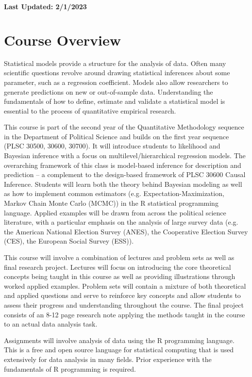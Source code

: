 \documentclass[11pt, article, oneside]{memoir}
\title{{\mytitle}}
\author{\myauthor\smallskip\footnotesize\newline Office: Pick Hall 328, 3rd floor
  \newline Office Hours: Tuesdays 4pm-6pm or schedule an appointment by e-mail \newline
    \myemail \newline \mywebsite
\newline
}
\date{}
\theoremstyle{Assumption}
\begin{document}
\maketitle
\textbf{Last Updated: 2/1/2023}
\section*{Course Overview}

Statistical models provide a structure for the analysis of data. Often many scientific questions revolve around drawing statistical inferences about some parameter, such as a regression coefficient. Models also allow researchers to generate predictions on new or out-of-sample data. Understanding the fundamentals of how to define, estimate and validate a statistical model is essential to the process of quantitative empirical research.

This course is part of the second year of the Quantitative Methodology sequence in the Department of Political Science and builds on the first year sequence (PLSC 30500, 30600, 30700). It will introduce students to likelihood and Bayesian inference with a focus on multilevel/hierarchical regression models. The overarching framework of this class is model-based inference for description and prediction -- a complement to the design-based framework of PLSC 30600 Causal Inference. Students will learn both the theory behind Bayesian modeling as well as how to implement common estimators (e.g. Expectation-Maximization, Markov Chain Monte Carlo (MCMC)) in the R statistical programming language. Applied examples will be drawn from across the political science literature, with a particular emphasis on the analysis of large survey data (e.g. the American National Election Survey (ANES), the Cooperative Election Survey (CES), the European Social Survey (ESS)).

This course will involve a combination of lectures and problem sets as well as final research project. Lectures will focus on introducing the core theoretical concepts being taught in this course as well as providing illustrations through worked applied examples. Problem sets will contain a mixture of both theoretical and applied questions and serve to reinforce key concepts and allow students to assess their progress and understanding throughout the course. The final project consists of an 8-12 page research note applying the methods taught in the course to an actual data analysis task. 

Assignments will involve analysis of data using the R programming language. This is a free and open source language for statistical computing that is used extensively for data analysis in many fields. Prior experience with the fundamentals of R programming is required.
\end{document}
